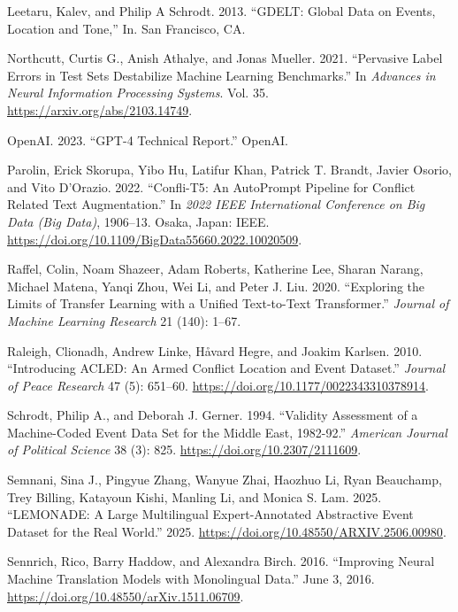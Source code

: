 \documentclass[
  11pt,
]{article}
\newlength{\cslhangindent}
\newenvironment{CSLReferences}[2] %
 {\begin{list}{}{%
  \setlength{\itemindent}{0pt}
  \setlength{\leftmargin}{0pt}
  \setlength{\parsep}{0pt}
  \ifodd #1
   \setlength{\leftmargin}{\cslhangindent}
   \setlength{\itemindent}{-1\cslhangindent}
  \fi
  \setlength{\itemsep}{#2\baselineskip}}}
 {\end{list}}
\begin{document}
\begin{CSLReferences}{1}{0}
Leetaru, Kalev, and Philip A Schrodt. 2013. {``{GDELT}: {Global Data} on
{Events}, {Location} and {Tone},''} In. San Francisco, CA.

Northcutt, Curtis G., Anish Athalye, and Jonas Mueller. 2021.
{``Pervasive {Label Errors} in {Test Sets Destabilize Machine Learning
Benchmarks}.''} In \emph{Advances in Neural Information Processing
Systems}. Vol. 35. \url{https://arxiv.org/abs/2103.14749}.

OpenAI. 2023. {``{GPT-4} Technical Report.''} OpenAI.

Parolin, Erick Skorupa, Yibo Hu, Latifur Khan, Patrick T. Brandt, Javier
Osorio, and Vito D'Orazio. 2022. {``Confli-{T5}: {An AutoPrompt
Pipeline} for {Conflict Related Text Augmentation}.''} In \emph{2022
{IEEE International Conference} on {Big Data} ({Big Data})}, 1906--13.
Osaka, Japan: IEEE.
\url{https://doi.org/10.1109/BigData55660.2022.10020509}.

Raffel, Colin, Noam Shazeer, Adam Roberts, Katherine Lee, Sharan Narang,
Michael Matena, Yanqi Zhou, Wei Li, and Peter J. Liu. 2020. {``Exploring
the Limits of Transfer Learning with a Unified Text-to-Text
Transformer.''} \emph{Journal of Machine Learning Research} 21 (140):
1--67.

Raleigh, Clionadh, Andrew Linke, Håvard Hegre, and Joakim Karlsen. 2010.
{``Introducing {ACLED}: {An} Armed Conflict Location and Event
Dataset.''} \emph{Journal of Peace Research} 47 (5): 651--60.
\url{https://doi.org/10.1177/0022343310378914}.

Schrodt, Philip A., and Deborah J. Gerner. 1994. {``Validity
{Assessment} of a {Machine-Coded Event Data Set} for the {Middle East},
1982-92.''} \emph{American Journal of Political Science} 38 (3): 825.
\url{https://doi.org/10.2307/2111609}.

Semnani, Sina J., Pingyue Zhang, Wanyue Zhai, Haozhuo Li, Ryan
Beauchamp, Trey Billing, Katayoun Kishi, Manling Li, and Monica S. Lam.
2025. {``{LEMONADE}: {A Large Multilingual Expert-Annotated Abstractive
Event Dataset} for the {Real World}.''} 2025.
\url{https://doi.org/10.48550/ARXIV.2506.00980}.

Sennrich, Rico, Barry Haddow, and Alexandra Birch. 2016. {``Improving
{Neural Machine Translation Models} with {Monolingual Data}.''} June 3,
2016. \url{https://doi.org/10.48550/arXiv.1511.06709}.


\end{CSLReferences}
\end{document}
